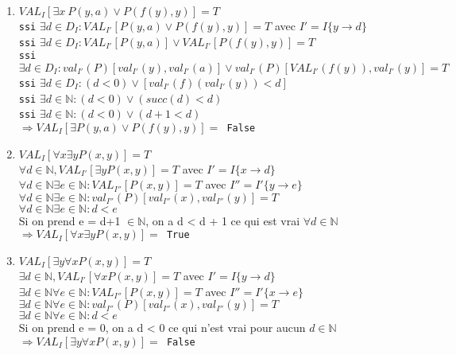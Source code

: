 {\begin{enumerate}
	\item
	    $VAL_I[\exists x \ P(y,a)\lor P(f(y), y)] = T$ 
    \\
    \texttt{ssi} $\exists d\in D_{I}:VAL_{I'}[P(y,a)\lor P(f(y),y)] = T$ avec $I' = I \{y \rightarrow d\}$
    \\
    \texttt{ssi} $\exists d\in D_{I}:VAL_{I'}[P(y,a)]\lor VAL_{I'}[P(f(y),y)] = T$
    \\
    \texttt{ssi} $\exists d\in D_{I}:val_{I'}(P)[val_{I'}(y), val_{I'}(a)]\lor val_{I'}(P)[VAL_{I'}(f(y)), val_{I'}(y)] = T$
    \\
    \texttt{ssi} $\exists d\in D_{I}:(d<0)\lor [val_{I'}(f)(val_{I'}(y)) < d]$
    \\%
    \texttt{ssi} $\exists d\in \mathbb{N}:(d<0)\lor (succ(d) < d)$
    \\
    \texttt{ssi} $\exists d\in \mathbb{N}: (d<0)\lor (d+1 < d)$
    \\
    $\Rightarrow  VAL_I[\exists P(y,a)\lor P(f(y), y)] = $\texttt{ False} 

    \item
    $VAL_I[\forall x \exists y P(x,y)] = T$
    \\
	$\forall d\in \mathbb{N}, VAL_{I'}[\exists yP(x,y)] = T$ avec $I' = I\{x \rightarrow d\}$
	\\
	$\forall d\in \mathbb{N} \exists e \in \mathbb{N} : VAL_{I''}[P(x,y)] = T$ avec $I'' = I'\{y \rightarrow e\}$
	\\
	$\forall d\in \mathbb{N} \exists e \in \mathbb{N} : val_{I''}(P)[val_{I''}(x), val_{I''}(y)] = T$
	\\
	$\forall d\in \mathbb{N} \exists e \in \mathbb{N} : d<e$ 
	\\
	Si on prend e = d+1 $\in \mathbb{N}$, on a d < d + 1 ce qui est vrai $\forall d \in \mathbb{N}$
	\\
	$\Rightarrow  VAL_I[\forall x \exists y P(x,y)] = $\texttt{ True}
	
    \item
    $VAL_I[\exists y \forall x P(x,y)] = T$
    \\
	$\exists d\in \mathbb{N}, VAL_{I'}[\forall xP(x,y)] = T$ avec $I' = I\{y \rightarrow d\}$
	\\
	$\exists d\in \mathbb{N} \forall e \in \mathbb{N} : VAL_{I''}[P(x,y)] = T$ avec $I'' = I'\{x \rightarrow e\}$
	\\
	$\exists d\in \mathbb{N} \forall e \in \mathbb{N} : val_{I''}(P)[val_{I''}(x), val_{I''}(y)] = T$
	\\
	$\exists d\in \mathbb{N} \forall e \in \mathbb{N} : d<e$ 
	\\
	Si on prend e = 0, on a d < 0 ce qui n'est vrai pour aucun $d \in \mathbb{N}$
	\\
	$\Rightarrow  VAL_I[\exists y \forall x P(x,y)] = $\texttt{ False}


\end{enumerate}}
